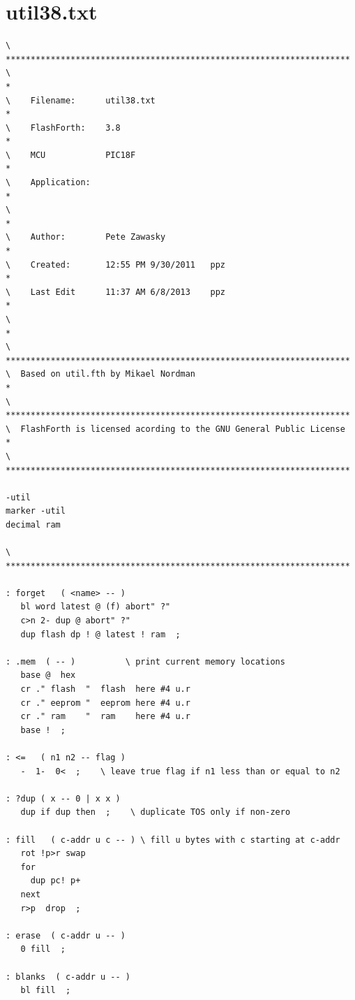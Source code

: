 \documentclass[12pt,a4paper]{article}
\begin{document}
\section{util38.txt}
\label{sec:util38}
%
{\scriptsize
\begin{verbatim}
\ *********************************************************************
\                                                                     *
\    Filename:      util38.txt                                        *
\    FlashForth:    3.8                                               *
\    MCU            PIC18F                                            *
\    Application:                                                     *
\                                                                     *
\    Author:        Pete Zawasky                                      *
\    Created:       12:55 PM 9/30/2011   ppz                          *
\    Last Edit      11:37 AM 6/8/2013    ppz                          *
\                                                                     *
\ *********************************************************************
\  Based on util.fth by Mikael Nordman                                *
\ *********************************************************************
\  FlashForth is licensed acording to the GNU General Public License  *
\ *********************************************************************

-util
marker -util
decimal ram

\ *********************************************************************

: forget   ( <name> -- )
   bl word latest @ (f) abort" ?"
   c>n 2- dup @ abort" ?"
   dup flash dp ! @ latest ! ram  ;
  
: .mem  ( -- )          \ print current memory locations
   base @  hex
   cr ." flash  "  flash  here #4 u.r
   cr ." eeprom "  eeprom here #4 u.r
   cr ." ram    "  ram    here #4 u.r
   base !  ;
   
: <=   ( n1 n2 -- flag )
   -  1-  0<  ;    \ leave true flag if n1 less than or equal to n2
   
: ?dup ( x -- 0 | x x )
   dup if dup then  ;    \ duplicate TOS only if non-zero
   
: fill   ( c-addr u c -- ) \ fill u bytes with c starting at c-addr
   rot !p>r swap
   for
     dup pc! p+
   next
   r>p  drop  ;   

: erase  ( c-addr u -- )
   0 fill  ;

: blanks  ( c-addr u -- )
   bl fill  ;


\end{verbatim}}
\end{document}
